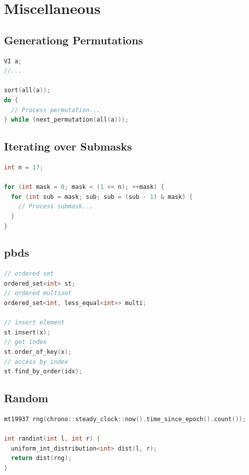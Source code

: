 \chapter{Miscellaneous}

\section{Generationg Permutations}
\begin{lstlisting}[language=C++]
VI a;
//...

sort(all(a));
do {
  // Process permutation...
} while (next_permutation(all(a)));
\end{lstlisting}
\sectionend

\section{Iterating over Submasks}
\begin{lstlisting}[language=C++]
int n = 17;

for (int mask = 0; mask < (1 << n); ++mask) {
  for (int sub = mask; sub; sub = (sub - 1) & mask) {
    // Process submask...
  }
}
\end{lstlisting}
\sectionend

\section{pbds}
\begin{lstlisting}[language=C++]
// ordered set
ordered_set<int> st;
// ordered multiset
ordered_set<int, less_equal<int>> multi;

// insert element
st.insert(x);
// get index
st.order_of_key(x);
// access by index
st.find_by_order(idx);
\end{lstlisting}
\sectionend

\section{Random}
\begin{lstlisting}[language=C++]
mt19937 rng(chrono::steady_clock::now().time_since_epoch().count());

int randint(int l, int r) {
  uniform_int_distribution<int> dist(l, r);
  return dist(rng);
}
\end{lstlisting}
\sectionend